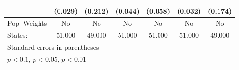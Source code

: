 {\begin{tabular}{l*{6}{c}}
            &     (0.029)         &     (0.212)         &     (0.044)         &     (0.058)         &     (0.032)         &     (0.174)         \\
\hline
Pop.-Weights&          No         &          No         &          No         &          No         &          No         &          No         \\
States:     &      51.000         &      49.000         &      51.000         &      51.000         &      51.000         &      49.000         \\
\hline\hline
\multicolumn{7}{l}{\footnotesize Standard errors in parentheses}\\
\multicolumn{7}{l}{\footnotesize \sym{*} \(p<0.1\), \sym{**} \(p<0.05\), \sym{***} \(p<0.01\)}\\
\end{tabular}
}
